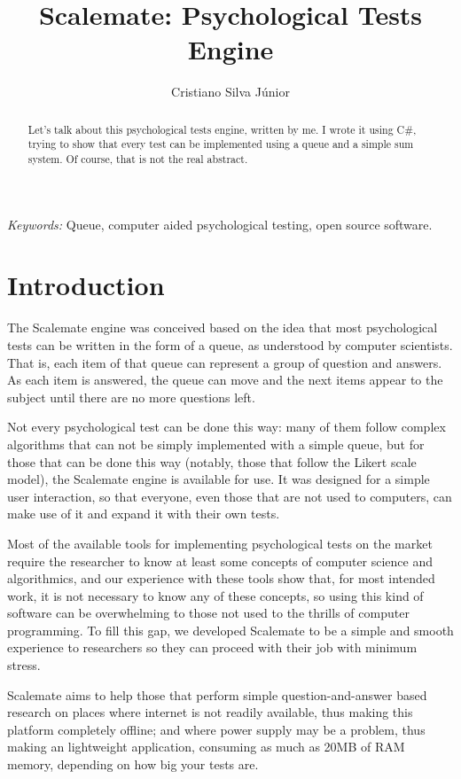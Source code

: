 \documentclass[12pt, a4paper, twoside]{article}
\begin{document}
\title{Scalemate: Psychological Tests Engine}
\author{Cristiano Silva Júnior}
\date{}
\maketitle

\begin{abstract}
Let's talk about this psychological tests engine, written by me. I wrote it using C\#, trying to show that every test can be implemented using a queue and a simple sum system. Of course, that is not the real abstract.
\end{abstract}

\emph{Keywords:} Queue, computer aided psychological testing, open source software.

\section{Introduction}

The Scalemate engine was conceived based on the idea that most psychological tests can be written in the form of a queue, as understood by computer scientists. That is, each item of that queue can represent a group of question and answers. As each item is answered, the queue can move and the next items appear to the subject until there are no more questions left.

Not every psychological test can be done this way: many of them follow complex algorithms that can not be simply implemented with a simple queue, but for those that can be done this way (notably, those that follow the Likert scale model), the Scalemate engine is available for use. It was designed for a simple user interaction, so that everyone, even those that are not used to computers, can make use of it and expand it with their own tests.

Most of the available tools for implementing psychological tests on the market require the researcher to know at least some concepts of computer science and algorithmics, and our experience with these tools show that, for most intended work, it is not necessary to know any of these concepts, so using this kind of software can be overwhelming to those not used to the thrills of computer programming. To fill this gap, we developed Scalemate to be a simple and smooth experience to researchers so they can proceed with their job with minimum stress.

Scalemate aims to help those that perform simple question-and-answer based research on places where internet is not readily available, thus making this platform completely offline; and where power supply may be a problem, thus making an lightweight application, consuming as much as 20MB of RAM memory, depending on how big your tests are.
\end{document}
